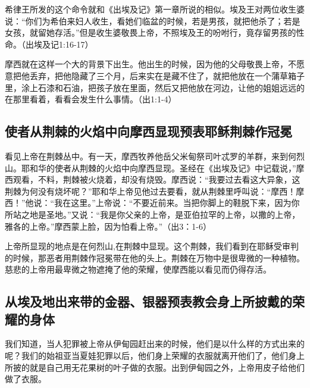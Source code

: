 希律王所发的这个命令就和《出埃及记》第一章所说的相似。埃及王对两位收生婆说：“你们为希伯来妇人收生，看她们临盆的时候，若是男孩，就把他杀了；若是女孩，就留她存活。”但是收生婆敬畏上帝，不照埃及王的吩咐行，竟存留男孩的性命。（出埃及记1:16-17）

摩西就在这样一个大的背景下出生。他出生的时候，因为他的父母敬畏上帝，不愿意把他丢弃，把他隐藏了三个月，后来实在是藏不住了，就把他放在一个蒲草箱子里，涂上石漆和石油，把孩子放在里面，然后又把他放在河边，让他的姐姐远远的在那里看着，看看会发生什么事情。（出1:1-4）



\subsection{使者从荆棘的火焰中向摩西显现预表耶稣荆棘作冠冕}
看见上帝在荆棘丛中。有一天，摩西牧养他岳父米甸祭司叶忒罗的羊群，来到何烈山。耶和华的使者从荆棘的火焰中向摩西显现。圣经在《出埃及记》中记载说，”摩西观看，不料，荆棘被火烧着，却没有烧毁。摩西说：“我要过去看这大异象，这荆棘为何没有烧坏呢？”耶和华上帝见他过去要看，就从荆棘里呼叫说：“摩西！摩西！”他说：“我在这里。”上帝说：“不要近前来。当把你脚上的鞋脱下来，因为你所站之地是圣地。”又说：“我是你父亲的上帝，是亚伯拉罕的上帝，以撒的上帝，雅各的上帝。”摩西蒙上脸，因为怕看上帝。”（出3：1-6）

上帝所显现的地点是在何烈山,在荆棘中显现。这个荆棘，我们看到在耶稣受审判的时候，那恶者用荆棘作冠冕带在他的头上。荆棘在万物中是很卑微的一种植物。慈悲的上帝用最卑微之物遮掩了他的荣耀，使摩西能以看见而仍得存活。

\subsection{从埃及地出来带的金器、银器预表教会身上所披戴的荣耀的身体}
我们知道，当人犯罪被上帝从伊甸园赶出来的时候，他们是以什么样的方式出来的呢？我们的始祖亚当夏娃犯罪以后，他们身上荣耀的衣服就离开他们了，他们身上所披的就是自己用无花果树的叶子做的衣服。出到伊甸园之外，上帝用皮子给他们做了衣服。

